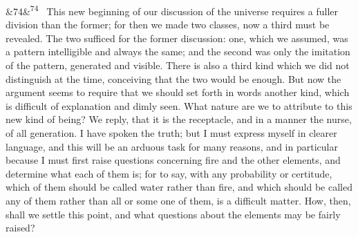 \documentclass[12pt]{article}
\newcommand{\para}[1][]{\par\noindent\ifx&#1&\else\textsuperscript{\footnotesize #1}~\fi}
\begin{document}
\para[74] This new beginning of our discussion of the universe requires a fuller division than the former; for then we made two classes, now a third must be revealed. The two sufficed for the former discussion: one, which we assumed, was a pattern intelligible and always the same; and the second was only the imitation of the pattern, generated and visible. There is also a third kind which we did not distinguish at the time, conceiving that the two would be enough. But now the argument seems to require that we should set forth in words another kind, which is difficult of explanation and dimly seen. What nature are we to attribute to this new kind of being? We reply, that it is the receptacle, and in a manner the nurse, of all generation. I have spoken the truth; but I must express myself in clearer language, and this will be an arduous task for many reasons, and in particular because I must first raise questions concerning fire and the other elements, and determine what each of them is; for to say, with any probability or certitude, which of them should be called water rather than fire, and which should be called any of them rather than all or some one of them, is a difficult matter. How, then, shall we settle this point, and what questions about the elements may be fairly raised?
\end{document}
